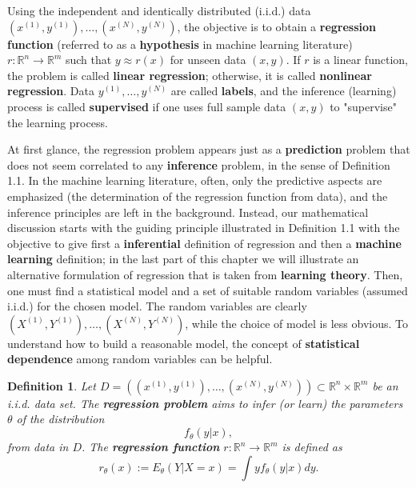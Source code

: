 \documentclass{report}
\newtheorem{definition}{Definition}[chapter]
\begin{document}
Using the independent and identically distributed (i.i.d.) data $(x^{(1)},y^{(1)}),\dots,(x^{(N)},y^{(N)})$, the objective is to obtain a \textbf{regression function} (referred to as a \textbf{hypothesis} in machine learning literature) $r : \mathbb{R}^n \to \mathbb{R}^m$ such that $y \approx r(x)$ for unseen data $(x,y)$. If $r$ is a linear function, the problem is called \textbf{linear regression}; otherwise, it is called \textbf{nonlinear regression}. Data $y^{(1)},\dots,y^{(N)}$ are called \textbf{labels}, and the inference (learning) process is called \textbf{supervised} if one uses full sample data $(x,y)$ to "supervise" the learning process.

At first glance, the regression problem appears just as a \textbf{prediction} problem that does not seem correlated to any \textbf{inference} problem, in the sense of Definition 1.1. In the machine learning literature, often, only the predictive aspects are emphasized (the determination of the regression function from data), and the inference principles are left in the background. Instead, our mathematical discussion starts with the guiding principle illustrated in Definition 1.1 with the objective to give first a \textbf{inferential } definition of regression and then a \textbf{machine learning} definition; in the last part of this chapter we will illustrate an alternative formulation of regression that is taken from \textbf{learning theory}. Then, one must
find a statistical model and a set of suitable random variables (assumed i.i.d.) for the chosen model. The random variables are clearly $(X^{(1)},Y^{(1)}),\dots,(X^{(N)},Y^{(N)})$, while the choice of model is less obvious. To understand how to build a reasonable model, the concept of \textbf{statistical dependence} among random variables can be helpful.


\begin{definition}
Let $D = ((x^{(1)},y^{(1)}),\dots,(x^{(N)},y^{(N)})) \subset \mathbb{R}^n \times \mathbb{R}^m$ be an i.i.d. data set. The \textbf{regression problem} aims to infer (or learn) the parameters $\theta$ of the distribution 
\begin{equation}
f_\theta(y|x),
\end{equation}
from data in $D$. The \textbf{regression function} $r : \mathbb{R}^n \to \mathbb{R}^m$ is defined as
\begin{equation}
 r_\theta(x) := E_\theta(Y|X = x) = \int yf_\theta(y|x)dy.
\end{equation}
\end{definition}
\end{document}
